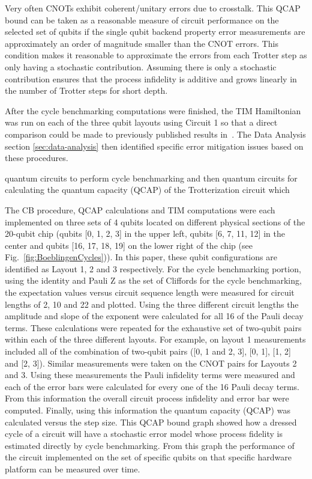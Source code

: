 Very often CNOTs exhibit coherent/unitary errors due to crosstalk. This QCAP bound can be taken as a reasonable measure of circuit performance on the selected set of qubits if the single qubit backend property error measurements are approximately an order of magnitude smaller than the CNOT errors.  This condition makes it reasonable to approximate the errors from each Trotter step as only having a stochastic contribution.  Assuming there is only a stochastic contribution ensures that the process infidelity is additive and grows linearly in the number of Trotter steps for short depth.

After the cycle benchmarking computations were finished, the TIM Hamiltonian was run on each of the three qubit layouts using Circuit 1 so that a direct comparison could be made to previously published results in~\cite{GustafsonIsing}.  The Data Analysis section \ref{sec:data-analysis} then identified specific error mitigation issues based on these procedures.



quantum circuits to perform cycle benchmarking and then quantum circuits for calculating the quantum capacity (QCAP) of the Trotterization circuit which





The CB procedure, QCAP calculations and TIM computations were each implemented on three sets of 4 qubits located on different physical sections of the 20-qubit chip (qubits [0, 1, 2, 3] in the upper left, qubits [6, 7, 11, 12] in the center and qubits [16, 17, 18, 19] on the lower right of the chip (see Fig.~\ref{fig:BoeblingenCycles})).  In this paper, these qubit configurations are identified as Layout 1, 2 and 3 respectively.  For the cycle benchmarking portion, using the identity and Pauli Z as the set of Cliffords for the cycle benchmarking, the expectation values versus circuit sequence length were measured for circuit lengths of 2, 10 and 22 and plotted. Using the three different circuit lengths the amplitude and slope of the exponent were calculated for all 16 of the Pauli decay terms.
These calculations were repeated for the exhaustive set of two-qubit pairs within each of the three different layouts.  For example, on layout 1 measurements included all of  the combination of two-qubit pairs ([0, 1 and 2, 3], [0, 1], [1, 2] and [2, 3]).  Similar measurements were taken on the CNOT pairs for Layouts 2 and 3.   Using these measurements the Pauli infidelity terms were measured and each of the error bars were calculated for every one of the 16 Pauli decay terms.  From this information the overall circuit process infidelity and error bar were computed.  Finally, using this information the quantum capacity (QCAP) was calculated versus the step size.  This QCAP bound graph showed how a dressed cycle of a circuit will have a stochastic error model whose process fidelity is estimated directly by cycle benchmarking.  From this graph the performance of the circuit implemented on the set of specific qubits on that specific hardware platform can be measured over time.  






